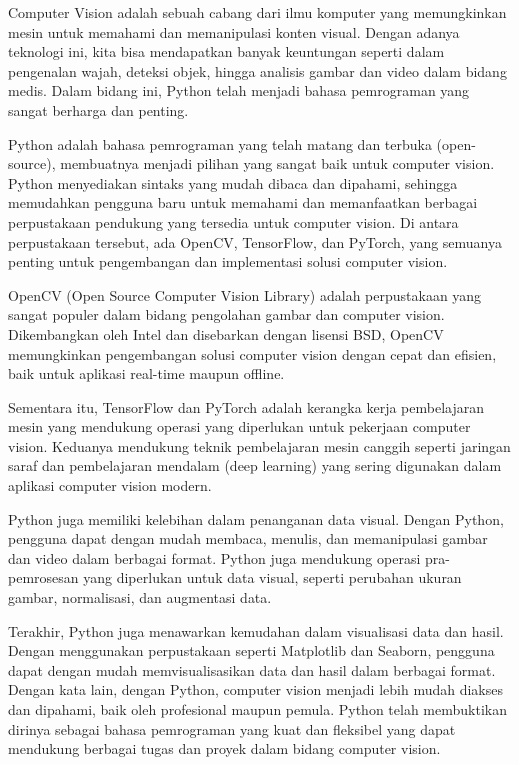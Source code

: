 \documentclass[
  letterpaper,
  DIV=11,
  numbers=noendperiod]{scrreprt}
\begin{document}

Computer Vision adalah sebuah cabang dari ilmu komputer yang
memungkinkan mesin untuk memahami dan memanipulasi konten visual. Dengan
adanya teknologi ini, kita bisa mendapatkan banyak keuntungan seperti
dalam pengenalan wajah, deteksi objek, hingga analisis gambar dan video
dalam bidang medis. Dalam bidang ini, Python telah menjadi bahasa
pemrograman yang sangat berharga dan penting.

Python adalah bahasa pemrograman yang telah matang dan terbuka
(open-source), membuatnya menjadi pilihan yang sangat baik untuk
computer vision. Python menyediakan sintaks yang mudah dibaca dan
dipahami, sehingga memudahkan pengguna baru untuk memahami dan
memanfaatkan berbagai perpustakaan pendukung yang tersedia untuk
computer vision. Di antara perpustakaan tersebut, ada OpenCV,
TensorFlow, dan PyTorch, yang semuanya penting untuk pengembangan dan
implementasi solusi computer vision.

OpenCV (Open Source Computer Vision Library) adalah perpustakaan yang
sangat populer dalam bidang pengolahan gambar dan computer vision.
Dikembangkan oleh Intel dan disebarkan dengan lisensi BSD, OpenCV
memungkinkan pengembangan solusi computer vision dengan cepat dan
efisien, baik untuk aplikasi real-time maupun offline.

Sementara itu, TensorFlow dan PyTorch adalah kerangka kerja pembelajaran
mesin yang mendukung operasi yang diperlukan untuk pekerjaan computer
vision. Keduanya mendukung teknik pembelajaran mesin canggih seperti
jaringan saraf dan pembelajaran mendalam (deep learning) yang sering
digunakan dalam aplikasi computer vision modern.

Python juga memiliki kelebihan dalam penanganan data visual. Dengan
Python, pengguna dapat dengan mudah membaca, menulis, dan memanipulasi
gambar dan video dalam berbagai format. Python juga mendukung operasi
pra-pemrosesan yang diperlukan untuk data visual, seperti perubahan
ukuran gambar, normalisasi, dan augmentasi data.

Terakhir, Python juga menawarkan kemudahan dalam visualisasi data dan
hasil. Dengan menggunakan perpustakaan seperti Matplotlib dan Seaborn,
pengguna dapat dengan mudah memvisualisasikan data dan hasil dalam
berbagai format.\\
Dengan kata lain, dengan Python, computer vision menjadi lebih mudah
diakses dan dipahami, baik oleh profesional maupun pemula. Python telah
membuktikan dirinya sebagai bahasa pemrograman yang kuat dan fleksibel
yang dapat mendukung berbagai tugas dan proyek dalam bidang computer
vision.
\end{document}
